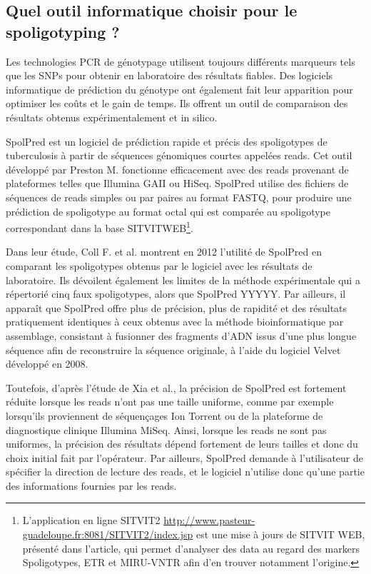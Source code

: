 \documentclass[twoside,a4paper,11pt,frenchb,openany]{report}
\begin{document}

\subsection{Quel outil informatique choisir pour le spoligotyping ?}

Les technologies PCR de génotypage utilisent toujours différents marqueurs tels que les SNPs pour obtenir en laboratoire des résultats fiables. Des logiciels informatique de prédiction du génotype ont également fait leur apparition pour optimiser les coûts et le gain de temps. Ils offrent un outil de comparaison des résultats obtenus expérimentalement et in silico.

SpolPred est un logiciel de prédiction rapide et précis des spoligotypes de tuberculosis à partir de séquences génomiques courtes appelées reads. Cet outil développé par Preston M. fonctionne efficacement avec des reads provenant de plateformes telles que Illumina GAII ou HiSeq. SpolPred utilise des fichiers de séquences de reads simples ou par paires au format FASTQ, pour produire une prédiction de spoligotype au format octal qui est comparée au spoligotype correspondant dans la base SITVITWEB\footnote{L'application en ligne SITVIT2 \url{http://www.pasteur-guadeloupe.fr:8081/SITVIT2/index.jsp} est une mise à jours de SITVIT WEB, présenté dans l'article\cite{demay}, qui permet d'analyser des data au regard des markers Spoligotypes, ETR et MIRU-VNTR afin d'en trouver notamment l'origine.}.

Dans leur étude, Coll F. et al.\cite{coll} montrent en 2012 l'utilité de SpolPred en comparant les spoligotypes obtenus par le logiciel avec les résultats de laboratoire. Ils dévoilent également les limites de la méthode expérimentale qui a répertorié cinq faux spoligotypes, alors que SpolPred YYYYY. Par ailleurs, il apparaît que SpolPred offre plus de précision, plus de rapidité et des résultats pratiquement identiques à ceux obtenus avec la méthode bioinformatique par assemblage, consistant à fusionner des fragments d'ADN issus d'une plus longue séquence afin de reconstruire la séquence originale, à l'aide du logiciel Velvet développé en 2008.

Toutefois, d'après l'étude de Xia et al.\cite{xia}, la précision de SpolPred est fortement réduite lorsque les reads n'ont pas une taille uniforme, comme par exemple lorsqu'ils proviennent de séquençages Ion Torrent ou de la plateforme de diagnostique clinique Illumina MiSeq. Ainsi, lorsque les reads ne sont pas uniformes, la précision des résultats dépend fortement de leurs tailles et donc du choix initial fait par l'opérateur. Par ailleurs, SpolPred demande à l'utilisateur de spécifier la direction de lecture des reads, et le logiciel n'utilise donc qu'une partie des informations fournies par les reads.
\end{document}
